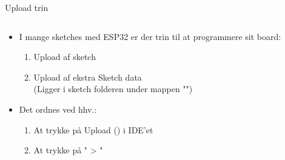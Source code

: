 \documentclass[aspectratio=169]{beamer}
\begin{document}
\begin{frame}{Upload trin}
\begin{columns}
	\begin{column}{0.5\textwidth}
		\begin{textBox}
			\begin{itemize}
				\item I mange sketches med ESP32 er der  trin til at programmere sit board:
				\begin{enumerate}
					\item Upload af sketch
					\item Upload af ekstra Sketch data \\
					(Ligger i sketch folderen under mappen "")
				\end{enumerate}
				\item Det ordnes ved hhv.:
				\begin{enumerate}
					\item At trykke på Upload () i IDE'et
					\item At trykke på " > "
				\end{enumerate}
			\end{itemize}
		\end{textBox}
	\end{column}

\end{columns}
\end{frame}
\end{document}
